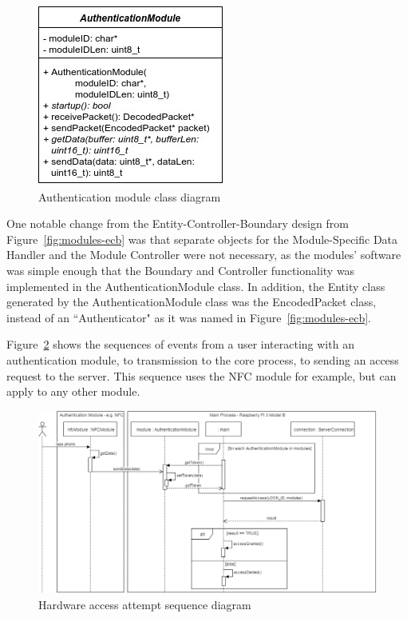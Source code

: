 \documentclass[12pt]{report}
\begin{document}
\begin{figure}
    \centering
    \includegraphics{Diagrams/Hardware-Diagrams/authenticationmodule_class}
    \caption{Authentication module class diagram}
    \label{fig:authentication-module-class-diagram}
\end{figure}

One notable change from the Entity-Controller-Boundary design from Figure~\ref{fig:modules-ecb} was that separate 
objects for the Module-Specific Data Handler and the Module Controller were not necessary, as the modules' software was 
simple enough that the Boundary and Controller functionality was implemented in the AuthenticationModule class. In 
addition, the Entity class generated by the AuthenticationModule class was the EncodedPacket class, instead of an 
``Authenticator" as it was named in Figure~\ref{fig:modules-ecb}.

Figure~\ref{fig:hardware-interaction-sequence} shows the sequences of events from a user interacting with an 
authentication module, to transmission to the core process, to sending an access request to the server. This sequence 
uses the NFC module for example, but can apply to any other module.

\begin{figure}
    \includegraphics[width=\textwidth]{Diagrams/Hardware-Diagrams/hardware_interaction_sequence}
    \caption{Hardware access attempt sequence diagram}
    \label{fig:hardware-interaction-sequence}
\end{figure}
\end{document}
